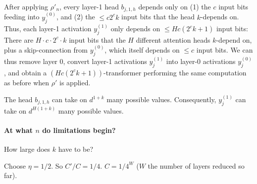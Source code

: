 \documentclass[11pt,a4paper]{article}
\begin{document}
After applying $\rho'_n$, every layer-1 head $b_{j,1,h}$ depends only on (1) the $c$ input bits feeding into $y_j^{(0)}$, and (2) the $\leq c2^ck$ input bits that the head $k$-depends on.
Thus, each layer-1 activation $y_j^{(1)}$ only depends on $\leq Hc(2^ck+1)$ input bits: There are $H\cdot c \cdot 2^c \cdot k$ input bits that the $H$ different attention heads $k$-depend on, plus a skip-connection from $y_j^{(0)}$, which itself depends on $\leq c$ input bits.
We can thus remove layer 0, convert layer-1 activations $y_j^{(1)}$ into layer-0 activations $y_j^{(0)}$, and obtain a $(Hc(2^ck+1))$-transformer performing the same computation as before when $\rho'$ is applied.



The head $b_{j,1,h}$ can take on $d^{1+k}$ many possible values.
Consequently, $y_j^{(1)}$ can take on $d^{H(1+k)}$ many possible values.

\paragraph{At what $n$ do limitations begin?}

How large does $k$ have to be?

Choose $\eta = 1/2$. So $C'/C = 1/4$. $C=1/4^W$ ($W$ the number of layers reduced so far).
\end{document}
